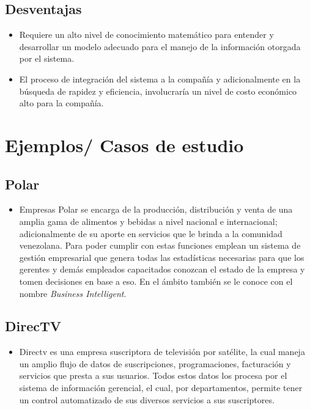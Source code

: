 \subsection{Desventajas}
\begin{itemize}
\item Requiere un alto nivel de conocimiento matemático para entender y desarrollar un modelo adecuado para el manejo de la información otorgada por el sistema.
\item El proceso de integración del sistema a la compañía y adicionalmente en la búsqueda de rapidez y eficiencia, involucraría un nivel de costo económico alto para la compañía.
\end{itemize}
\section {Ejemplos/ Casos de estudio}
\subsection{Polar}
\begin{itemize}
\item Empresas Polar se encarga de la producción, distribución y venta de una amplia gama de alimentos y bebidas a nivel nacional e internacional; adicionalmente de su aporte en servicios que le brinda a la comunidad venezolana. Para poder cumplir con estas funciones emplean un sistema de gestión empresarial que genera todas las estadísticas necesarias para que los gerentes y demás empleados capacitados conozcan el estado de la empresa y tomen decisiones en base a eso. En el ámbito también se le conoce con el nombre \emph{Business Intelligent}.
\end{itemize}
\subsection{DirecTV}
\begin{itemize} 
\item Directv es una empresa suscriptora de televisión por satélite, la cual maneja un amplio flujo de datos de suscripciones, programaciones, facturación y servicios que presta a sus usuarios. Todos estos datos los procesa por el sistema de información gerencial, el cual, por departamentos, permite tener un control automatizado de sus diversos servicios a sus suscriptores.
\end{itemize}
